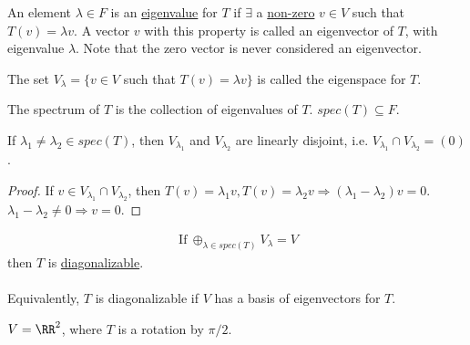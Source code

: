 \documentclass[class=scrartcl, crop=false]{standalone}
\begin{document}
\begin{definition}[Eigenvalue]
  An element $\lambda \in F$ is an \ul{eigenvalue} for $T$ if $\exists$ a \ul{non-zero} $v \in V$ such that $T(v) = \lambda v$. A vector $v$ with this property is called an eigenvector of  $T$, with eigenvalue $\lambda$. Note that the zero vector is never considered an eigenvector.
\end{definition} 

\begin{definition}[Eigenspace]
  The set $V_\lambda = \{v \in V$ such that $T(v) = \lambda v\}$ is called the eigenspace for $T$.
\end{definition} 

\begin{definition}[Spectrum]
  The spectrum of $T$ is the collection of eigenvalues of $T$. $spec(T) \subseteq F$.
\end{definition} 

\begin{proposition}
  If $\lambda_1 \neq \lambda_2 \in spec(T)$, then $V_{\lambda_1}$ and $V_{\lambda_2}$ are linearly disjoint, i.e. $V_{\lambda_1}\cap V_{\lambda_2} = (0)$.
  \\
  \begin{proof}
    If $v \in V_{\lambda_1}\cap V_{\lambda_2}$, then $T(v) = \lambda_1v, T(v) = \lambda_2v \Rightarrow (\lambda_1 - \lambda_2)v = 0$. $\lambda_1 - \lambda_2 \neq 0 \Rightarrow v = 0$.
  \end{proof} 
\end{proposition} 

\begin{definition}[Diagonalizable]
  \begin{gather*}
    \ \text{If} \ \oplus_{\lambda \in spec(T)}V_\lambda = V
  \end{gather*} 
  then $T$ is \ul{diagonalizable}.
  \\\\
  Equivalently, $T$ is diagonalizable if $V$ has a basis of eigenvectors for $T$.
\end{definition} 

\begin{example}
  \begin{enumerate}
    \ii
    $V = \RR^2$, where $T$ is a rotation by $\pi / 2$.
  \end{enumerate} 
\end{example} 
\end{document}
